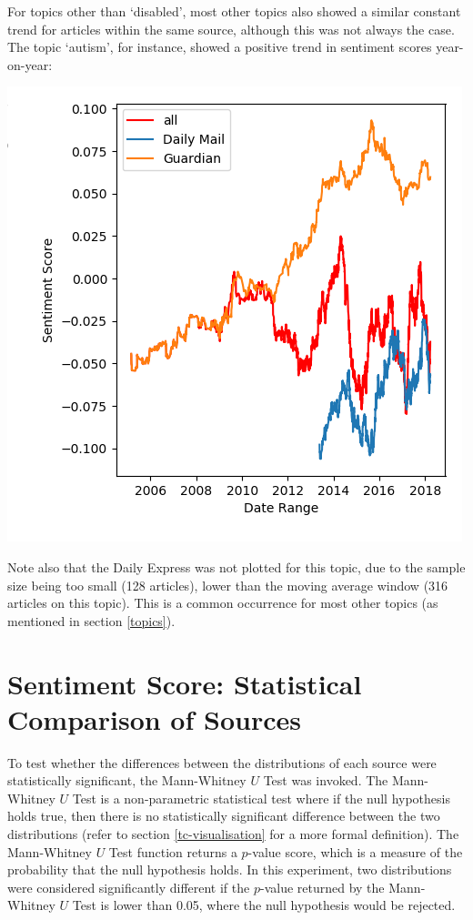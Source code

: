 \documentclass{report}
\begin{document}
For topics other than `disabled', most other topics also showed a similar constant trend for articles within the same source, although this was not always the case. 
The topic `autism', for instance, showed a positive trend in sentiment scores year-on-year:

\begin{center}
	\includegraphics[width=0.5\linewidth]{autism.png}
\end{center}

Note also that the Daily Express was not plotted for this topic, due to the sample size being too small (128 articles), lower than the moving average window (316 articles on this topic). 
This is a common occurrence for most other topics (as mentioned in section \ref{topics}).

\section{Sentiment Score: Statistical Comparison of Sources} \label{Sentiment score: statistical comparison of different sources}

To test whether the differences between the distributions of each source were statistically significant, the Mann-Whitney $U$ Test \cite{mann1947test} was invoked.
The Mann-Whitney $U$ Test is a non-parametric statistical test where if the null hypothesis holds true, then there is no statistically significant difference between the two distributions (refer to section \ref{tc-visualisation} for a more formal definition).
The Mann-Whitney $U$ Test function returns a $p$-value score, which is a measure of the probability that the null hypothesis holds.
In this experiment, two distributions were considered significantly different if the $p$-value returned by the Mann-Whitney $U$ Test is lower than 0.05, where the null hypothesis would be rejected.
\end{document}
